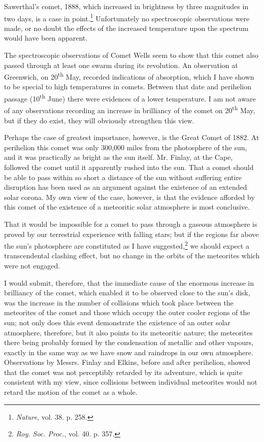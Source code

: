 \documentclass[a4paper, 12pt, oneside, polutonikogreek, english]{article}
\begin{document}
Sawerthal's comet, 1888, which increased in brightness by three magnitudes in two days, is a case in point.\footnote{\emph{Nature}, vol. 38. p. 258.} Unfortunately no spectroscopic observations were made, or no doubt the effects of the increased temperature upon the spectrum would have been apparent.

The spectroscopic observations of Comet Wells seem to show that this comet also passed through at least one swarm during its revolution. An observation at Greenwich, on 20\textsuperscript{th} May, recorded indications of absorption, which I have shown to be special to high temperatures in comets. Between that date and perihelion passage (10\textsuperscript{th} June) there were evidences of a lower temperature. I am not aware of any observations recording an increase in brilliancy of the comet on 20\textsuperscript{th} May, but if they do exist, they will obviously strengthen this view.

Perhaps the case of greatest importance, however, is the Great Comet of 1882. At perihelion this comet was only 300,000 miles from the photosphere of the sun, and it was practically as bright as the sun itself. Mr. Finlay, at the Cape, followed the comet until it apparently rushed into the sun. That a comet should be able to pass within so short a distance of the sun without suffering entire disruption has been used as an argument against the existence of an extended solar corona. My own view of the case, however, is that the evidence afforded by this comet of the existence of a meteoritic solar atmosphere is most conclusive.

That it would be impossible for a comet to pass through a gaseous atmosphere is proved by our terrestrial experience with falling stars; but if the regions far above the sun's photosphere are constituted as I have suggested,\footnote{\emph{Roy. Soc. Proc.}, vol. 40. p. 357.} we should expect a transcendental clashing effect, but no change in the orbits of the meteorites which were not engaged.

I would submit, therefore, that the immediate cause of the enormous increase in brilliancy of the comet, which enabled it to be observed close to the sun's disk, was the increase in the number of collisions which took place between the meteorites of the comet and those which occupy the outer cooler regions of the sun; not only does this event demonstrate the existence of an outer solar atmosphere, therefore, but it also points to its meteoritic nature; the meteorites there being probably formed by the condensation of metallic and other vapours, exactly in the same way as we have snow and raindrops in our own atmosphere. Observations by Messrs. Finlay and Elkins, before and after perihelion, showed that the comet was not perceptibly retarded by its adventure, which is quite consistent with my view, since collisions between individual meteorites would not retard the motion of the comet as a whole.
\end{document}
